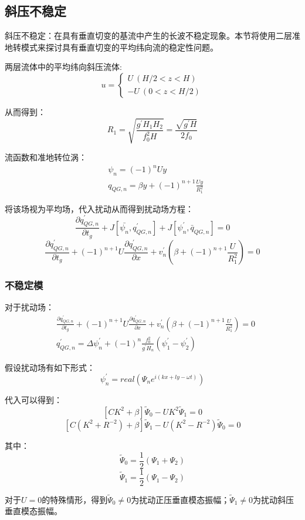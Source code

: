 \documentclass{article}
\begin{document}
\subsection{斜压不稳定}
斜压不稳定：在具有垂直切变的基流中产生的长波不稳定现象。本节将使用二层准地转模式来探讨具有垂直切变的平均纬向流的稳定性问题。

两层流体中的平均纬向斜压流体:
$$u=\begin{cases}
    U \ (H/2<z<H) \\
    -U \ (0 < z < H/2)
\end{cases}$$

从而得到：
$$R_1 = \sqrt{\frac{g^{\prime}H_1H_2}{f_0^2H}} = \frac{\sqrt{g^{\prime}H}}{2f_0}$$

流函数和准地转位涡：
\begin{align}
&\psi_n = (-1)^nUy\\
&q_{QG,n} = \beta y + (-1)^{n+1}\frac{Uy}{R_1^2}   
\end{align}

将该场视为平均场，代入扰动从而得到扰动场方程：
$$\frac{\partial q^{\prime}_{QG,n}}{\partial t_g} + J[\bar{\psi_n}, q^{\prime}_{QG,n}] + J[\psi^{\prime}_n, \bar{q}_{QG,n}]= 0$$
$$\frac{\partial q^{\prime}_{QG,n}}{\partial t_g} + (-1)^{n+1}U\frac{\partial q^{\prime}_{QG,n}}{\partial x} + v^{\prime}_n\left(\beta + (-1)^{n+1}\frac{U}{R_1^2}\right)= 0$$

\subsubsection{不稳定模}
对于扰动场：
\begin{align}
    &\frac{\partial q^{\prime}_{QG,n}}{\partial t_g} + (-1)^{n+1}U\frac{\partial q^{\prime}_{QG,n}}{\partial x} + v^{\prime}_n\left(\beta + (-1)^{n+1}\frac{U}{R_1^2}\right)= 0\\
    &q^{\prime}_{QG,n} = \Delta \psi^{\prime}_n + (-1)^{n}\frac{f_0^2}{g^{\prime}H_n}(\psi_1^{\prime} - \psi_2^{\prime})
\end{align}

假设扰动场有如下形式：
$$\psi^{\prime}_n = real(\Psi_ne^{i(kx+ly-\omega t)})$$

代入可以得到：
$$[CK^2 +\beta]\tilde{\Psi}_0-UK^2\tilde{\Psi}_1 = 0$$
$$[C(K^2+R^{-2}) +\beta]\tilde{\Psi}_1-U(K^2-R^{-2})\tilde{\Psi}_0 = 0$$

其中：
$$\tilde{\Psi}_0 = \frac{1}{2}(\Psi_1 +\Psi_2)$$
$$\tilde{\Psi}_1 = \frac{1}{2}(\Psi_1 -\Psi_2)$$

对于$U=0$的特殊情形，得到$\tilde{\Psi}_0\ne0$为扰动正压垂直模态振幅；$\tilde{\Psi}_1\ne0$为扰动斜压垂直模态振幅。
\end{document}

